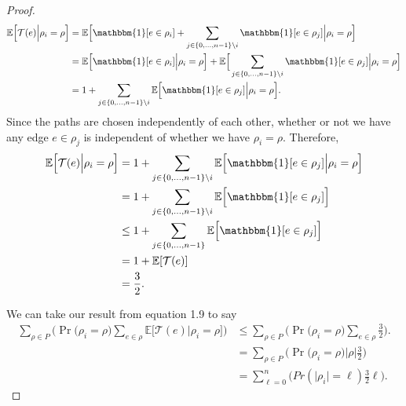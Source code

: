 \documentclass[psamsfonts, 10pt]{amsart}
\theoremstyle{definition}
\theoremstyle{remark}
\numberwithin{equation}{section}
\newcommand{\E}{\mathbb{E}}
\newcommand{\indicator}{\mathbbm{1}}
\begin{document}
\begin{proof}
\begin{equation}
\begin{aligned}
\E\Big[\mathcal{T}(e) \Big\lvert \rho_i = \rho \Big] &= \E\Big[  \indicator[e \in \rho_i] + \sum_{j \in \{0, ..., n-1\} \setminus i}\indicator[e \in \rho_j] \Big\lvert \rho_i = \rho \Big]\\
&=  \E\Big[ \indicator[e \in \rho_i] \Big\lvert \rho_i = \rho \Big] + \E\Big[\sum_{j \in \{0, ..., n-1\} \setminus i}\indicator[e \in \rho_j] \Big\lvert  \rho_i = \rho \Big]\\
&= 1 + \sum_{j \in \{0, ..., n-1\} \setminus i}\E\Big[\indicator[e \in \rho_j] \Big\lvert  \rho_i = \rho \Big].\\
\end{aligned}
\end{equation}
Since the paths are chosen independently of each other, whether or not we have any edge $e \in \rho_j$ is independent of whether we have $\rho_i = \rho$. Therefore, 
\begin{equation}
\begin{aligned}
\E\Big[\mathcal{T}(e) \Big\lvert \rho_i = \rho \Big] &= 1 + \sum_{j \in \{0, ..., n-1\} \setminus i}\E\Big[\indicator[e \in \rho_j] \Big\lvert  \rho_i = \rho \Big]\\
&= 1 + \sum_{j \in \{0, ..., n-1\} \setminus i}\E\Big[\indicator[e \in \rho_j] \Big]\\
&\leq 1 + \sum_{j \in \{0, ..., n-1\}}\E\Big[\indicator[e \in \rho_j] \Big]\\
&= 1 + \E[\mathcal{T}(e)]\\
&= \frac{3}{2}.
\end{aligned}
\end{equation}

We can take our result from equation 1.9 to say
\begin{equation}
\begin{aligned}
\sum_{\rho \in P} \bigg(\Pr\Big(\rho_i = \rho\Big) \sum_{e \in \rho}\E\Big[ \mathcal{T}(e) \lvert \rho_i = \rho\Big]\bigg) &\leq \sum_{\rho \in P} \bigg(\Pr\Big(\rho_i = \rho\Big) \sum_{e \in \rho}\frac{3}{2}\bigg). \\
&= \sum_{\rho \in P} \bigg(\Pr\Big(\rho_i = \rho\Big)\lvert \rho \rvert\frac{3}{2}\bigg)\\
&= \sum_{\ell= 0}^n\bigg(Pr(\lvert \rho_i \rvert = \ell )\frac{3}{2}\ell\bigg).
\end{aligned}
\end{equation}


\end{proof}
\end{document}
